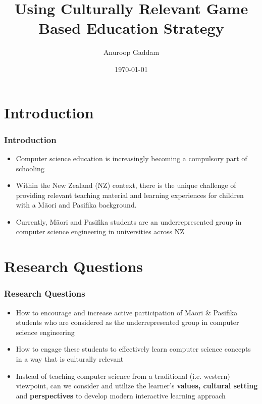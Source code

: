 \documentclass[aspectratio=169]{beamer}
\title{Using Culturally Relevant Game Based Education Strategy}
\author{Anuroop Gaddam }
\date{ \today}
\institute{School of Engineering \& Computer Science \\
Victoria University of Wellington, New Zealand\\
\url{Anuroop.Gaddam@vuw.ac.nz}}
\begin{document}
\begin{frame}[plain,t]
\titlepage
\end{frame}


\section{Introduction}
\begin{frame}
\frametitle{Introduction}
\begin{itemize}
\item Computer science education is increasingly becoming a compulsory part of schooling
	\newline
\item Within the New Zealand (NZ) context, there is the unique challenge of providing relevant teaching material and learning experiences for children with a M\=aori and Pasifika background.
	\newline
\item Currently, M\=aori and Pasifika students are an underrepresented group in computer science engineering in universities across NZ
\end{itemize}
\end{frame}

\section{Research Questions}
\begin{frame}
\frametitle{Research Questions}
\begin{itemize}
\item How to encourage and increase active participation of M\=aori \& Pasifika students who are considered as the underrepresented group in computer science engineering
	\newline
\item How to engage these students to effectively learn computer science concepts in a way that is culturally relevant
	\newline
\item Instead of teaching computer science from a traditional (i.e. western) viewpoint, can we consider and utilize the learner’s \textbf{values, cultural setting} and \textbf{perspectives} to develop modern interactive learning approach
	
\end{itemize}
\end{frame}
\end{document}
